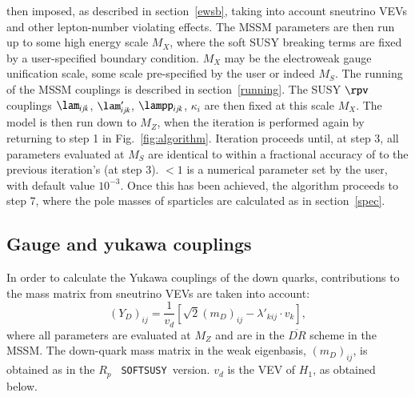 \documentclass[final,3p,times,pdflatex]{elsarticle}
\begin{document}
then imposed, as described in section~\ref{ewsb}, taking into account
sneutrino VEVs and other lepton-number violating effects. The MSSM parameters
are then run up to some high energy scale $M_X$, where the soft SUSY breaking
terms are fixed by a user-specified boundary condition. $M_X$ may be the
electroweak gauge unification scale, some scale pre-specified by the user or
indeed $M_S$. The running of the MSSM couplings is described in
section~\ref{running}. 
The SUSY $\rpv$ couplings $\lam_{ijk}$, $\lam'_{ijk}$,
$\lampp_{ijk}$, $\kappa_i$ are then fixed at this scale $M_X$.
The model is then run down to $M_Z$, when the iteration is performed again by
returning to step 1 in Fig.~\ref{fig:algorithm}. Iteration proceeds until, at
step 3, all parameters evaluated at $M_S$ are identical to within a fractional
accuracy of  to the previous iteration's (at step 3). 
$<1$ is a numerical parameter set by the user, with default
value $10^{-3}$. 
Once this has been
achieved, the algorithm proceeds to step 7, where the pole masses of
sparticles are calculated as in section~\ref{spec}.

\subsection{Gauge and yukawa couplings \label{gyuk}}

In order to calculate the Yukawa couplings of the down quarks, contributions
to the mass matrix from sneutrino VEVs are taken into 
account:
\begin{equation}
(Y_{D})_{ij} = \frac{1}{v_d}\left[\sqrt{2}(m_D)_{ij} -\lambda'_{kij}\cdot
   {v_k}\right], 
\end{equation}
where all parameters are evaluated at $M_Z$ and are in the $\overline{DR}$
scheme in the MSSM\@. The down-quark mass matrix in the weak eigenbasis,
$(m_D)_{ij}$, is obtained as in the $R_p$ {\tt 
  SOFTSUSY}~version. $v_d$ is the VEV of $H_1$, as obtained below.
\end{document}
